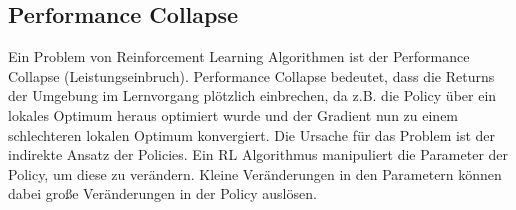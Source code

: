 \subsection{Performance Collapse}
Ein Problem von Reinforcement Learning Algorithmen ist der Performance Collapse (Leistungseinbruch). Performance Collapse bedeutet, dass die Returns der Umgebung im Lernvorgang plötzlich einbrechen, da z.B. die Policy über ein lokales Optimum heraus optimiert wurde und der Gradient nun zu einem schlechteren lokalen Optimum konvergiert. Die Ursache für das Problem ist der indirekte Ansatz der Policies. Ein RL Algorithmus manipuliert die Parameter der Policy, um diese zu verändern. Kleine Veränderungen in den Parametern können dabei große Veränderungen in der Policy auslösen.


